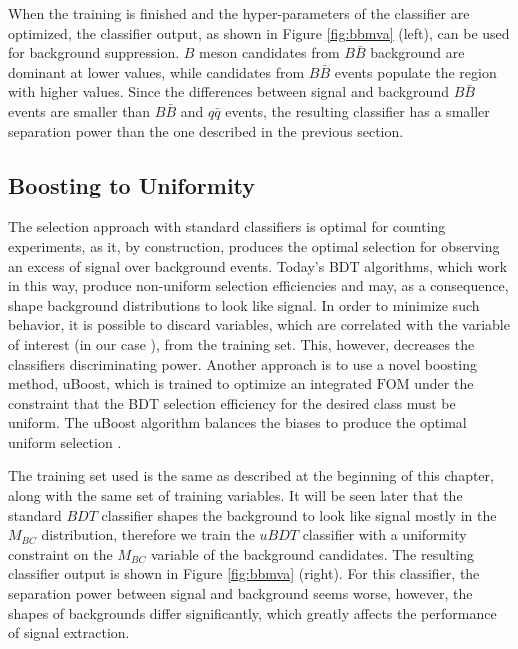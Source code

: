 When the training is finished and the hyper-parameters of the classifier are optimized, the classifier output, as shown in Figure \ref{fig:bbmva} (left), can be used for background suppression. $B$ meson candidates from $B \bar B$ background are dominant at lower values, while candidates from $B \bar B$ events populate the region with higher values. Since the differences between signal and background $B \bar B$ events are smaller than $B \bar B$ and $q \bar q$ events, the resulting classifier has a smaller separation power than the one described in the previous section.

\subsection{Boosting to Uniformity}
The selection approach with standard classifiers is optimal for counting experiments, as it, by construction, produces the optimal selection for observing an excess of signal over background events. Today's BDT algorithms, which work in this way, produce non-uniform selection efficiencies and may, as a consequence, shape background distributions to look like signal. In order to minimize such behavior, it is possible to discard variables, which are correlated with the variable of interest (in our case \vars), from the training set. This, however, decreases the classifiers discriminating power. Another approach is to use a novel boosting method, uBoost, which is trained to optimize an integrated $\mathrm{FOM}$ under the constraint that the BDT selection efficiency for the desired class must be uniform. The uBoost algorithm balances the biases to produce the optimal uniform selection \cite{stevens2013uboost}.

The training set used is the same as described at the beginning of this chapter, along with the same set of training variables. It will be seen later that the standard $BDT$ classifier shapes the background to look like signal mostly in the $M_{BC}$ distribution, therefore we train the $uBDT$ classifier with a uniformity constraint on the $M_{BC}$ variable of the background candidates. The resulting classifier output is shown in Figure \ref{fig:bbmva} (right). For this classifier, the separation power between signal and background seems worse, however, the shapes of backgrounds differ significantly, which greatly affects the performance of signal extraction.


